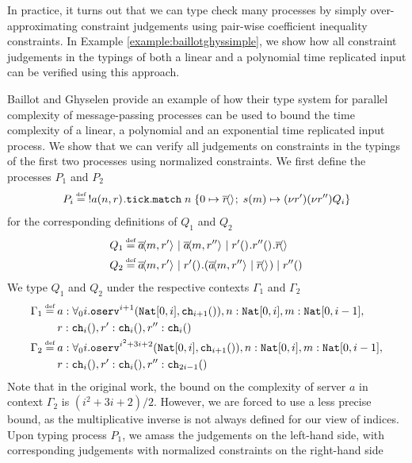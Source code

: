 In practice, it turns out that we can type check many processes by simply over-approximating constraint judgements using pair-wise coefficient inequality constraints. In Example \ref{example:baillotghyssimple}, we show how all constraint judgements in the typings of both a linear and a polynomial time replicated input can be verified using this approach. 
%
\begin{example}\label{example:baillotghyssimple}
Baillot and Ghyselen \cite{BaillotGhyselen2021} provide an example of how their type system for parallel complexity of message-passing processes can be used to bound the time complexity of a linear, a polynomial and an exponential time replicated input process. We show that we can verify all judgements on constraints in the typings of the first two processes using normalized constraints. We first define the processes $P_1$ and $P_2$
\begin{align*}
    P_i \defeq\; !\inputch{a}{n,r}{}{\tick\match{n}{\asyncoutputch{r}{}{}}{m}{\newvar{r'}{\newvar{r''}{Q_i}}}}
\end{align*}
for the corresponding definitions of $Q_1$ and $Q_2$
\begin{align*}
    Q_1 \defeq&\; \asyncoutputch{a}{m,r'}{} \mid \asyncoutputch{a}{m,r''}{} \mid \inputch{r'}{}{}{\inputch{r''}{}{}{\asyncoutputch{r}{}{}}}\\
    Q_2 \defeq&\; \asyncoutputch{a}{m,r'}{} \mid \inputch{r'}{}{}{(\asyncoutputch{a}{m,r''}{} \mid \asyncoutputch{r}{}{})} \mid \asyncinputch{r''}{}{}
\end{align*}
We type $Q_1$ and $Q_2$ under the respective contexts $\Gamma_1$ and $\Gamma_2$
\begin{align*}
    \Gamma_1 \defeq&\; a : \forall_0 i.\texttt{oserv}^{i+1}(\texttt{Nat}[0,i],\texttt{ch}_{i+1}()), n : \texttt{Nat}[0,i], m : \texttt{Nat}[0,i-1],\\ &\; r : \texttt{ch}_{i}(),
     r' : \texttt{ch}_{i}(), r'' : \texttt{ch}_i()\\
    \Gamma_2 \defeq&\; a : \forall_0 i.\texttt{oserv}^{i^2+3i+2}(\texttt{Nat}[0,i],\texttt{ch}_{i+1}()), n : \texttt{Nat}[0,i], m : \texttt{Nat}[0,i-1],\\ &\; r : \texttt{ch}_{i}(),
     r' : \texttt{ch}_i(), r'' : \texttt{ch}_{2i-1}()
\end{align*}
Note that in the original work, the bound on the complexity of server $a$ in context $\Gamma_2$ is $(i^2+3i+2)/2$. However, we are forced to use a less precise bound, as the multiplicative inverse is not always defined for our view of indices. Upon typing process $P_1$, we amass the judgements on the left-hand side, with corresponding judgements with normalized constraints on the right-hand side

\end{example}
